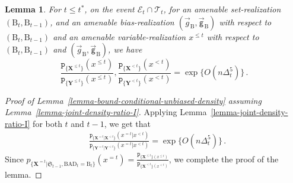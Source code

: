 \documentclass[11pt]{article}
\newtheorem{Lemma}[Theorem]{Lemma}
\numberwithin{equation}{section}
\begin{document}
\begin{Lemma} {\label{lemma-joint-density-ratio-I}}
For $t \leq t^*$, on the event $\mathcal{E}_{t} \cap \mathcal{T}_{t}$, for an amenable set-realization $(\mathrm{B}_t, \mathrm{B}_{t-1})$, and an amenable bias-realization $( \overrightarrow{g}_{\mathrm{B}}, \overrightarrow{\mathsf{g}}_{\mathrm{B}} )$ with respect to $(\mathrm{B}_t, \mathrm{B}_{t-1})$ and an amenable variable-realization $x^{\leq t}$ with respect to $(\mathrm{B}_t, \mathrm{B}_{t-1})$ and $( \overrightarrow{g}_{\mathrm{B}}, \overrightarrow{\mathsf{g}}_{\mathrm{B}} )$, we have 
\begin{equation} \label{equ-def-ratio-joint-density}
    \frac{\mathtt{p}_{ \{ \mathbf{X}^{\leq t} \} } ( x^{\leq t}  ) }{ \mathtt{p}_{ \{ \mathbf{Y}^{\leq t} \} } ( x^{\leq t} )}, \frac{ \mathtt{p}_{ \{ \mathbf{X}^{<t} \} } ( x^{<t} ) }{ \mathtt{p}_{ \{ \mathbf{Y}^{<t} \} } ( x^{<t} ) } = \exp \big\{ O ( n \Delta_t^5 ) \big\}  \,.
\end{equation}
\end{Lemma}
\begin{proof}[Proof of Lemma~\ref{lemma-bound-conditional-unbiased-density} assuming Lemma~\ref{lemma-joint-density-ratio-I}]
Applying Lemma~\ref{lemma-joint-density-ratio-I} for both $t$ and $t-1$, we get that 
\begin{align*}
    & \frac{  \mathtt{p}_{ \{ \mathbf{X}^{=t} | \mathbf{X}^{<t} \} } ( x^{=t} | x^{<t} ) }{ \mathtt{p}_{ \{ \mathbf{Y}^{=t} |  \mathbf{Y}^{<t} \} } ( x^{=t} | x^{<t} ) }   = \exp \{ O ( n \Delta_t^5 ) \}\,. 
\end{align*}
Since $p_{ \{ \mathbf{X}^{=t} | \mathfrak{S}_{t-1}, \mathrm{BAD}_t = \mathrm{B}_t \}} (x^{=t})  = \frac{  \mathtt{p}_{ \{ \mathbf{X}^{\leq t} \} (x^{\leq t}) }  }{ \mathtt{p}_{ \{ \mathbf{X}^{<t} \} (x^{<t}) } }$, we complete the proof of the lemma.
\end{proof}
 
\end{document}
